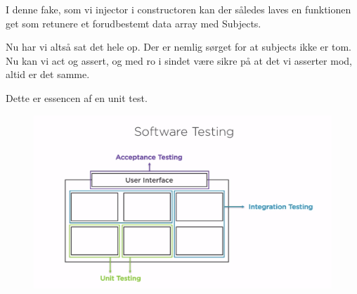 \documentclass{article}
\begin{document}
I denne fake, som vi injector i constructoren kan der således laves en funktionen get som retunere et forudbestemt data array med Subjects. 

Nu har vi altså sat det hele op. Der er nemlig sørget for at subjects ikke er tom. Nu kan vi act og assert, og med ro i sindet være sikre på at det vi asserter mod, altid er det samme.

Dette er essencen af en unit test.


\begin{figure}[H]
	\centering
	\includegraphics[width = \textwidth]{../softwaretesting.PNG}
\end{figure}
\end{document}
